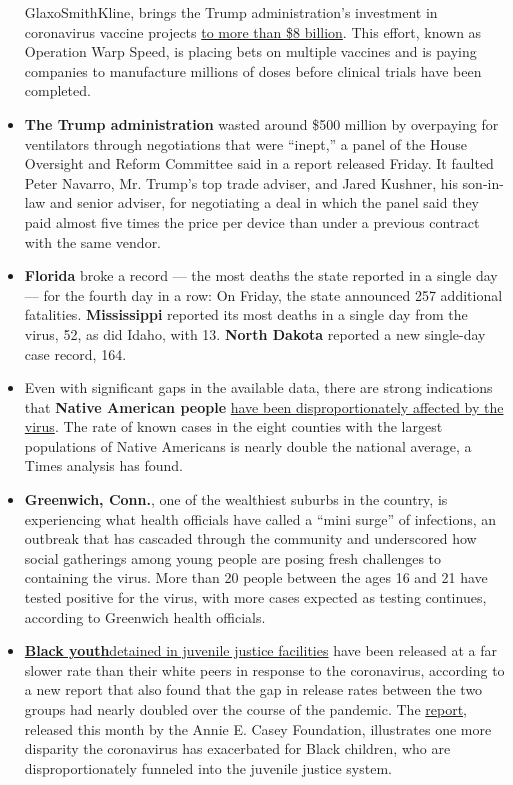 \begin{itemize}
  GlaxoSmithKline, brings the Trump administration's investment in
  coronavirus vaccine projects
  \href{https://medicalcountermeasures.gov/app/barda/coronavirus/COVID19.aspx?filter=vaccine}{to
  more than \$8 billion}. This effort, known as Operation Warp Speed, is
  placing bets on multiple vaccines and is paying companies to
  manufacture millions of doses before clinical trials have been
  completed.
\item
  \textbf{The Trump administration} wasted around \$500 million by
  overpaying for ventilators through negotiations that were ``inept,'' a
  panel of the House Oversight and Reform Committee said in a report
  released Friday. It faulted Peter Navarro, Mr. Trump's top trade
  adviser, and Jared Kushner, his son-in-law and senior adviser, for
  negotiating a deal in which the panel said they paid almost five times
  the price per device than under a previous contract with the same
  vendor.
\item
  \textbf{Florida} broke a record --- the most deaths the state reported
  in a single day --- for the fourth day in a row: On Friday, the state
  announced 257 additional fatalities. \textbf{Mississippi} reported its
  most deaths in a single day from the virus, 52, as did Idaho, with 13.
  \textbf{North Dakota} reported a new single-day case record, 164.
\item
  Even with significant gaps in the available data, there are strong
  indications that \textbf{Native American people}
  \href{https://www.nytimes.com/2020/07/30/us/native-americans-coronavirus-data.html}{have
  been disproportionately affected by the virus}. The rate of known
  cases in the eight counties with the largest populations of Native
  Americans is nearly double the national average, a Times analysis has
  found.
\item
  \textbf{Greenwich, Conn.}, one of the wealthiest suburbs in the
  country, is experiencing what health officials have called a ``mini
  surge'' of infections, an outbreak that has cascaded through the
  community and underscored how social gatherings among young people are
  posing fresh challenges to containing the virus. More than 20 people
  between the ages 16 and 21 have tested positive for the virus, with
  more cases expected as testing continues, according to Greenwich
  health officials.
\item
  \textbf{\href{https://www.nytimes.com/2020/07/30/us/politics/juvenile-detainees-coronavirus.html}{Black
  youth}}\href{https://www.nytimes.com/2020/07/30/us/politics/juvenile-detainees-coronavirus.html}{detained
  in juvenile justice facilities} have been released at a far slower
  rate than their white peers in response to the coronavirus, according
  to a new report that also found that the gap in release rates between
  the two groups had nearly doubled over the course of the pandemic. The
  \href{https://www.aecf.org/blog/youth-detention-admissions-remain-low-but-releases-stall-despite-covid-19/}{report},
  released this month by the Annie E. Casey Foundation, illustrates one
  more disparity the coronavirus has exacerbated for Black children, who
  are disproportionately funneled into the juvenile justice system.
\end{itemize}


